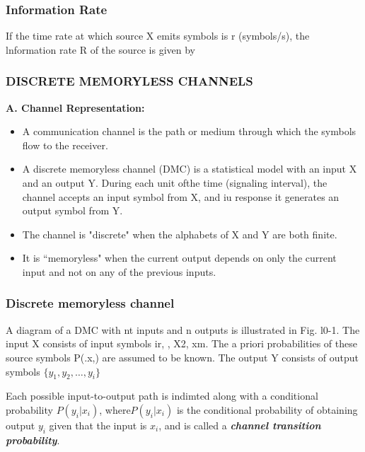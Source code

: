 \documentclass[a4]{beamer}
\begin{document}



\begin{frame}
\frametitle{Information Rate}
If the time rate at which source X emits symbols is r (symbols/s), the lnformation rate R of the
source is given by


\end{frame}



\begin{frame} \frametitle{DISCRETE MEMORYLESS CHANNELS}
\textbf{A. Channel Representation:}\\
\begin{itemize}
\item A communication channel is the path or medium through which the symbols flow to the receiver. \item A discrete memoryless channel (DMC) is a statistical model with an input X and an output Y.
During each unit ofthe time (signaling interval), the channel accepts an input symbol from X, and iu
response it generates an output symbol from Y.\item  The channel is "discrete" when the alphabets of X and
Y are both finite.\item It is ``memoryless" when the current output depends on only the current input and
not on any of the previous inputs.\end{itemize}
\end{frame}

\begin{frame}
\frametitle{Discrete memoryless channel}
A diagram of a DMC with nt inputs and n outputs is illustrated in Fig. l0-1. The input X consists
of input symbols ir, , X2,   xm. 
The a priori probabilities of these source symbols P(.x,) are assumed to be known. 
The output Y consists of output symbols $\{y_1,y_2,\ldots, y_i \}$

Each possible input-to-output path is indimted along with a conditional probability $P(y_i|x_i)$, where$P(y_i|x_i)$  is the conditional probability of
obtaining output $y_i$ given that the input is $x_i$, and is called a \textbf{\emph{channel transition probability}}.
\end{frame}
\end{document}
